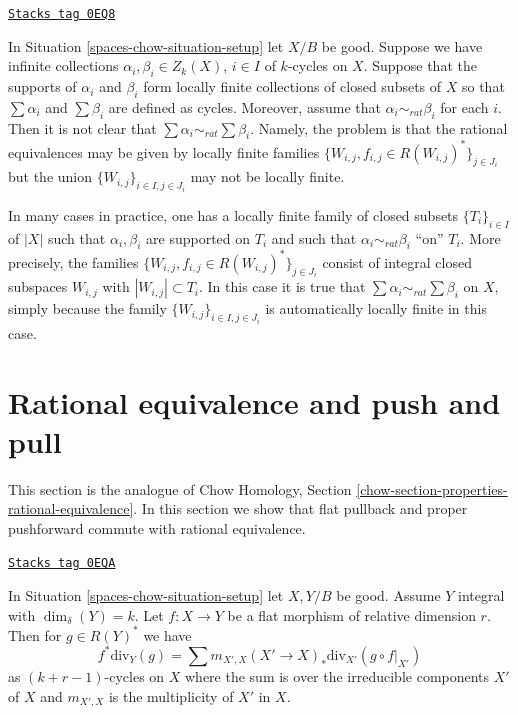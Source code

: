 \begin{remark}
\label{spaces-chow-remark-infinite-sums-rational-equivalences}
\href{https://stacks.math.columbia.edu/tag/0EQ8}{\texttt{Stacks tag 0EQ8}}

In Situation \ref{spaces-chow-situation-setup} let $X/B$ be good.
Suppose we have infinite collections $\alpha_i, \beta_i \in Z_k(X)$,
$i \in I$ of $k$-cycles on $X$. Suppose that the supports
of $\alpha_i$ and $\beta_i$ form locally finite collections
of closed subsets of $X$ so that $\sum \alpha_i$
and $\sum \beta_i$ are defined as cycles. Moreover, assume that
$\alpha_i \sim_{rat} \beta_i$ for each $i$. Then it is not
clear that $\sum \alpha_i \sim_{rat} \sum \beta_i$. Namely,
the problem is that the rational equivalences may be
given by locally finite
families $\{W_{i, j}, f_{i, j} \in R(W_{i, j})^*\}_{j \in J_i}$
but the union $\{W_{i, j}\}_{i \in I, j\in J_i}$ may not
be locally finite.

\medskip\noindent
In many cases in practice, one has a locally finite family of closed
subsets $\{T_i\}_{i \in I}$ of $|X|$ such that $\alpha_i, \beta_i$
are supported on $T_i$ and such that $\alpha_i \sim_{rat} \beta_i$
``on'' $T_i$. More precisely, the families
$\{W_{i, j}, f_{i, j} \in R(W_{i, j})^*\}_{j \in J_i}$
consist of integral closed subspaces $W_{i, j}$
with $|W_{i, j}| \subset T_i$. In this case it is true that
$\sum \alpha_i \sim_{rat} \sum \beta_i$ on $X$, simply because
the family $\{W_{i, j}\}_{i \in I, j\in J_i}$ is automatically
locally finite in this case.
\end{remark}

\section{Rational equivalence and push and pull}
\label{spaces-chow-section-properties-rational-equivalence}
This section is the analogue of
Chow Homology, Section \ref{chow-section-properties-rational-equivalence}.
In this section we show that flat pullback and proper pushforward
commute with rational equivalence.

\begin{lemma}
\label{spaces-chow-lemma-prepare-flat-pullback-rational-equivalence}
\href{https://stacks.math.columbia.edu/tag/0EQA}{\texttt{Stacks tag 0EQA}}

In Situation \ref{spaces-chow-situation-setup} let $X, Y/B$ be good.
Assume $Y$ integral with $\dim_\delta(Y) = k$.
Let $f : X \to Y$ be a flat morphism of
relative dimension $r$. Then for $g \in R(Y)^*$ we have
$$
f^*\text{div}_Y(g) =
\sum m_{X', X} (X' \to X)_*\text{div}_{X'}(g \circ f|_{X'})
$$
as $(k + r - 1)$-cycles on $X$ where the sum is over the irreducible
components $X'$ of $X$ and $m_{X', X}$ is the multiplicity of $X'$ in $X$.
\end{lemma}

